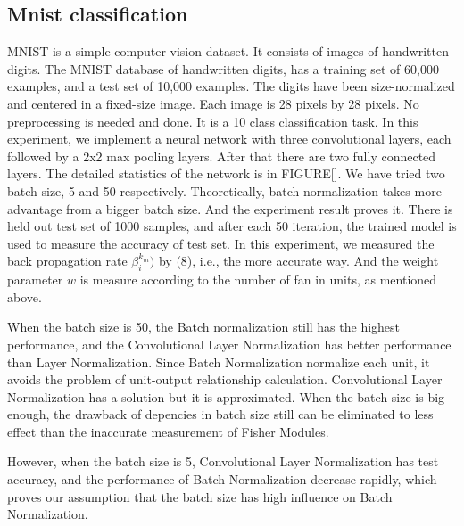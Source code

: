 \documentclass{sig-alternate}
\begin{document}
    \subsection{Mnist classification}
    MNIST is a simple computer vision dataset. It consists of images of handwritten digits. The MNIST database of handwritten digits, has a training set of 60,000 examples, and a test set of 10,000 examples. The digits have been  size-normalized and centered in a fixed-size image. Each image is 28 pixels by 28 pixels. No preprocessing is needed and done. It is a 10 class classification task.
    In this experiment, we implement a neural network with three convolutional layers, each followed by a 2x2 max pooling layers. After that there are two fully connected layers. The detailed statistics of the network is in FIGURE[]. We have tried two batch size, 5 and 50 respectively. Theoretically, batch normalization takes more advantage from a bigger batch size. And the experiment result proves it. There is held out test set of 1000 samples, and after each 50 iteration, the trained model is used to measure the accuracy of test set. In this experiment, we measured the back propagation rate $\beta_i^{k_m})$ by (8), i.e., the more accurate way. And the weight parameter $w$ is measure according to the number of fan in units, as mentioned above. 
    
    When the batch size is 50, the Batch normalization still has the highest performance, and the Convolutional Layer Normalization has better performance than Layer Normalization. Since Batch Normalization normalize each unit, it avoids the problem of unit-output relationship calculation. Convolutional Layer Normalization has a solution but it is approximated. When the batch size is big enough, the drawback of depencies in batch size still can be eliminated to less effect than the inaccurate measurement of Fisher Modules. 
    
    However, when the batch size is 5, Convolutional Layer Normalization has test accuracy, and the performance of Batch Normalization decrease rapidly, which proves our assumption that the batch size has high influence on Batch Normalization.
    
\end{document}
